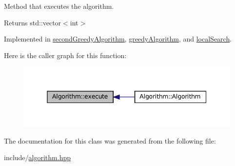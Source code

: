 Method that executes the algorithm. 

\begin{DoxyReturn}{Returns}
std\+::vector$<$int$>$ 
\end{DoxyReturn}


Implemented in \hyperlink{classsecondGreedyAlgorithm_a119a730116003d00438179ccf4e2cafd}{second\+Greedy\+Algorithm}, \hyperlink{classgreedyAlgorithm_a37c81600b24a32ae25b6f0eeab643a7a}{greedy\+Algorithm}, and \hyperlink{classlocalSearch_a0ac1d7bf221f1ab7af92f1a91017cf02}{local\+Search}.

Here is the caller graph for this function\+:
\nopagebreak
\begin{figure}[H]
\begin{center}
\leavevmode
\includegraphics[width=345pt]{classAlgorithm_af6ea9eb9a6dbd41896e3fd7dabac096b_icgraph}
\end{center}
\end{figure}


The documentation for this class was generated from the following file\+:\begin{DoxyCompactItemize}
\item 
include/\hyperlink{algorithm_8hpp}{algorithm.\+hpp}\end{DoxyCompactItemize}
